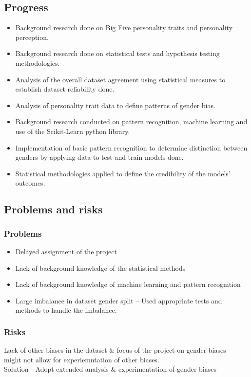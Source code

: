 \documentclass[11pt]{article}
\begin{document}
\subsection{Progress}\label{progress}
\begin{itemize}
    \item Background research done on Big Five personality traits and personality
    perception.
    \item Background research done on statistical tests and hypothesis testing methodologies.
    \item Analysis of the overall dataset agreement using statistical measures to establish
    dataset reliability done.
    \item Analysis of personality trait data to define patterns of gender bias.
    \item Background research conducted on pattern recognition, machine learning and use
    of the Scikit-Learn python library.
    \item Implementation of basic pattern recognition to determine distinction between
    genders by applying data to test and train models done.
    \item Statistical methodologies applied to define the credibility of the models’ outcomes.
\end{itemize}


\subsection{Problems and risks}\label{problems-and-risks}

\subsubsection{Problems}\label{problems}

\begin{itemize}
    \item Delayed assignment of the project
    \item Lack of background knowledge of the statistical methods
    \item Lack of background knowledge of machine learning and pattern recognition
    \item Large imbalance in dataset gender split – Used appropriate tests and methods to
    handle the imbalance.
\end{itemize}

\subsubsection{Risks}\label{risks}
Lack of other biases in the dataset \& focus of the project on gender biases - might not allow for experiemntation of other biases. 
\\Solution - Adopt extended analysis \& experimentation of gender biases
\end{document}
